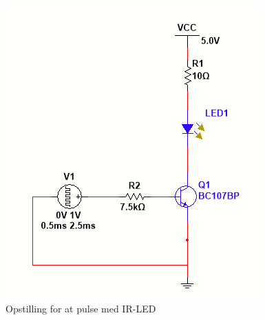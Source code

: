 \documentclass[HardwareDesign/HardwareDesign_main.tex]{subfiles}
\begin{document}
\begin{figure}[H]
    \centering
    \includegraphics{Rapport/BallDispenser/BallCountSensor/graphics/Opstilling1.png}
    \caption{Opstilling for at pulse med IR-LED}
    \label{fig:IRLEDpuls}
\end{figure}
\end{document}
